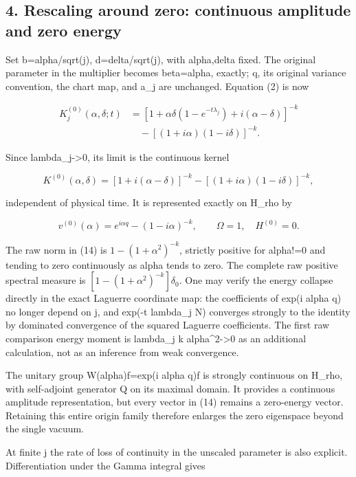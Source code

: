 \documentclass[
  11pt,
]{article}
\begin{document}
\subsection{4. Rescaling around zero: continuous amplitude and zero
energy}\label{weak-coupling-part-5-rescaling-around-zero-continuous-amplitude-and-zero-energy}

Set b=alpha/sqrt(j), d=delta/sqrt(j), with alpha,delta fixed. The
original parameter in the multiplier becomes beta=alpha, exactly; q, its
original variance convention, the chart map, and a\_j are unchanged.
Equation (2) is now

\[
 \begin{split}
 K_j^{(0)}(\alpha,\delta;t)
 &=[1+\alpha\delta(1-e^{-t\lambda_j})+i(\alpha-\delta)]^{-k}\\
 &\quad-[(1+i\alpha)(1-i\delta)]^{-k}.
 \end{split}
\]

Since lambda\_j-\textgreater0, its limit is the continuous kernel

\[
 K^{(0)}(\alpha,\delta)=
 [1+i(\alpha-\delta)]^{-k}
 -[(1+i\alpha)(1-i\delta)]^{-k},
 \tag{13}
\]

independent of physical time. It is represented exactly on H\_rho by

\[
 v^{(0)}(\alpha)=e^{i\alpha q}-(1-i\alpha)^{-k},\qquad
 \Omega=1,
 \quad H^{(0)}=0.
 \tag{14}
\]

The raw norm in (14) is \(1-(1+\alpha^2)^{-k}\), strictly positive for
alpha!=0 and tending to zero continuously as alpha tends to zero. The
complete raw positive spectral measure is
\([1-(1+\alpha^2)^{-k}]\delta_0\). One may verify the energy collapse
directly in the exact Laguerre coordinate map: the coefficients of exp(i
alpha q) no longer depend on j, and exp(-t lambda\_j N) converges
strongly to the identity by dominated convergence of the squared
Laguerre coefficients. The first raw comparison energy moment is
lambda\_j k alpha\^{}2-\textgreater0 as an additional calculation, not
as an inference from weak convergence.

The unitary group W(alpha)f=exp(i alpha q)f is strongly continuous on
H\_rho, with self-adjoint generator Q on its maximal domain. It provides
a continuous amplitude representation, but every vector in (14) remains
a zero-energy vector. Retaining this entire origin family therefore
enlarges the zero eigenspace beyond the single vacuum.

At finite j the rate of loss of continuity in the unscaled parameter is
also explicit. Differentiation under the Gamma integral gives
\end{document}
